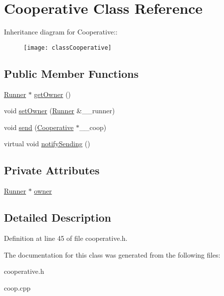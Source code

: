 \hypertarget{classCooperative}{
\section{Cooperative Class Reference}
\label{classCooperative}
}
Inheritance diagram for Cooperative::\begin{figure}[H]
\begin{center}
\leavevmode
\texttt{[image: classCooperative]}
\end{center}
\end{figure}
\subsection*{Public Member Functions}
\begin{CompactItemize}
\item 
\hypertarget{classCooperative_4012b4e8329e87d26ee266491e1a883e}{
\hyperlink{classRunner}{Runner} $\ast$ \hyperlink{classCooperative_4012b4e8329e87d26ee266491e1a883e}{get\-Owner} ()}
\label{classCooperative_4012b4e8329e87d26ee266491e1a883e}

\item 
\hypertarget{classCooperative_fe7b022567174c8305bc78d8c5749b12}{
void \hyperlink{classCooperative_fe7b022567174c8305bc78d8c5749b12}{set\-Owner} (\hyperlink{classRunner}{Runner} \&\_\-\_\-runner)}
\label{classCooperative_fe7b022567174c8305bc78d8c5749b12}

\item 
\hypertarget{classCooperative_c609f2a1200da7d1ac96005602515fc6}{
void \hyperlink{classCooperative_c609f2a1200da7d1ac96005602515fc6}{send} (\hyperlink{classCooperative}{Cooperative} $\ast$\_\-\_\-coop)}
\label{classCooperative_c609f2a1200da7d1ac96005602515fc6}

\item 
\hypertarget{classCooperative_4439ddeaa1246a2e44c003bfb781739b}{
virtual void \hyperlink{classCooperative_4439ddeaa1246a2e44c003bfb781739b}{notify\-Sending} ()}
\label{classCooperative_4439ddeaa1246a2e44c003bfb781739b}

\end{CompactItemize}
\subsection*{Private Attributes}
\begin{CompactItemize}
\item 
\hypertarget{classCooperative_7604f094479d08154ede4996a45bf79e}{
\hyperlink{classRunner}{Runner} $\ast$ \hyperlink{classCooperative_7604f094479d08154ede4996a45bf79e}{owner}}
\label{classCooperative_7604f094479d08154ede4996a45bf79e}

\end{CompactItemize}


\subsection{Detailed Description}




Definition at line 45 of file cooperative.h.

The documentation for this class was generated from the following files:\begin{CompactItemize}
\item 
cooperative.h\item 
coop.cpp\end{CompactItemize}
